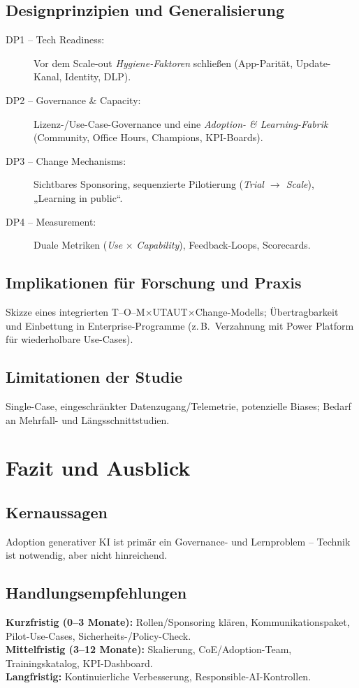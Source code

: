 \documentclass[12pt,a4paper,oneside]{article} %
\begin{document}
\subsection{Designprinzipien und Generalisierung}
\begin{description}
    \item[DP1 – Tech Readiness:] Vor dem Scale-out \emph{Hygiene-Faktoren} schließen (App-Parität, Update-Kanal, Identity, DLP).
    \item[DP2 – Governance \& Capacity:] Lizenz-/Use-Case-Governance und eine \emph{Adoption- \& Learning-Fabrik} (Community, Office Hours, Champions, KPI-Boards).
    \item[DP3 – Change Mechanisms:] Sichtbares Sponsoring, sequenzierte Pilotierung (\emph{Trial $\rightarrow$ Scale}), „Learning in public“.
    \item[DP4 – Measurement:] Duale Metriken (\emph{Use} $\times$ \emph{Capability}), Feedback-Loops, Scorecards.
\end{description}

\subsection{Implikationen für Forschung und Praxis}
Skizze eines integrierten T–O–M$\times$UTAUT$\times$Change-Modells; Übertragbarkeit und Einbettung in Enterprise-Programme (z.\,B.\ Verzahnung mit Power Platform für wiederholbare Use-Cases).

\subsection{Limitationen der Studie}
Single-Case, eingeschränkter Datenzugang/Telemetrie, potenzielle Biases; Bedarf an Mehrfall- und Längsschnittstudien.


\section{Fazit und Ausblick}
\subsection{Kernaussagen}
Adoption generativer KI ist primär ein Governance- und Lernproblem – Technik ist notwendig, aber nicht hinreichend.

\subsection{Handlungsempfehlungen}
\textbf{Kurzfristig (0–3 Monate):} Rollen/Sponsoring klären, Kommunikationspaket, Pilot-Use-Cases, Sicherheits-/Policy-Check.\\
\textbf{Mittelfristig (3–12 Monate):} Skalierung, CoE/Adoption-Team, Trainingskatalog, KPI-Dashboard.\\
\textbf{Langfristig:} Kontinuierliche Verbesserung, Responsible-AI-Kontrollen.
\end{document}
